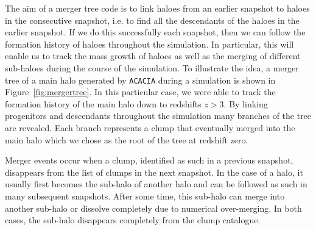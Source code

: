 The aim of a merger tree code is to link haloes from an earlier
snapshot to haloes in the consecutive snapshot, i.e. to find all the
descendants of the haloes in the earlier snapshot. If we do this
successfully each snapshot, then we can follow the formation history of
haloes throughout the simulation. In particular, this will enable us
to track the mass growth of haloes as well as the merging of different
sub-haloes during the course of the simulation.
To illustrate the idea, a merger tree of a main halo generated by
\texttt{ACACIA} during a simulation is shown in Figure~\ref{fig:mergertree}.
In this particular case, we were able to track the formation history of the
main halo down to redshifts $z > 3$. By linking progenitors and descendants
throughout the simulation many branches of the tree are revealed.
Each branch represents a clump that eventually merged into the main halo
which we chose as the root of the tree at redshift zero.

Merger events occur when a clump, identified as such in a previous
snapshot, disappears from the list of clumps in the next snapshot. In
the case of a halo, it usually first becomes the sub-halo of another
halo and can be followed as such in many subsequent snapshots. After
some time, this sub-halo can merge into another sub-halo or dissolve
completely due to numerical over-merging. In both cases, the sub-halo
disappears completely from the clump catalogue.

